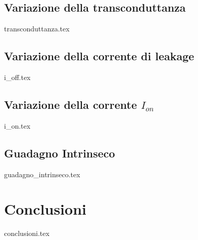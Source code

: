 \documentclass[
	a4paper,
	cleardoublepage=empty,
	headings=twolinechapter,
	numbers=autoenddot,
]{scrbook}
\begin{document}
\section{Variazione della transconduttanza}
{transconduttanza.tex}

\section{Variazione della corrente di leakage}
{i_off.tex}

\section{Variazione della corrente $I_{on}$}
{i_on.tex}

\section{Guadagno Intrinseco}
{guadagno_intrinseco.tex}

\backmatter

\chapter*{Conclusioni}
{conclusioni.tex}



\end{document}
